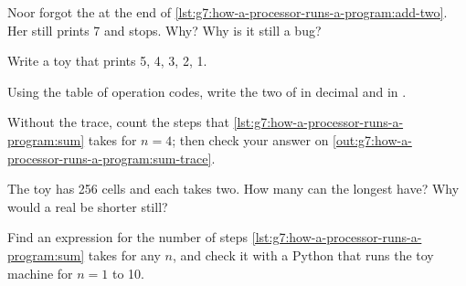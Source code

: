 \begin{exercise}[$\star\star$]\label{exo:g7:how-a-processor-runs-a-program:6}
Noor forgot the  at the end of
\cref{lst:g7:how-a-processor-runs-a-program:add-two}. Her  still
prints 7 and stops. Why? Why is it still a bug?
\end{exercise}

\begin{exercise}[$\star\star$]\label{exo:g7:how-a-processor-runs-a-program:7}
Write a toy  that prints 5, 4, 3, 2, 1.
\end{exercise}

\begin{exercise}[$\star\star$]\label{exo:g7:how-a-processor-runs-a-program:8}
Using the table of operation codes, write the two  of
 in decimal and in .
\end{exercise}

\begin{exercise}[$\star\star$]\label{exo:g7:how-a-processor-runs-a-program:9}
Without the trace, count the steps that
\cref{lst:g7:how-a-processor-runs-a-program:sum} takes for $n = 4$; then
check your answer on \cref{out:g7:how-a-processor-runs-a-program:sum-trace}.
\end{exercise}

\begin{exercise}[$\star\star\star$]\label{exo:g7:how-a-processor-runs-a-program:10}
The toy  has 256 cells and each  takes two. How many
 can the longest  have? Why would a real  be
shorter still?
\end{exercise}

\begin{exercise}[$\star\star\star$]\label{exo:g7:how-a-processor-runs-a-program:11}
Find an expression for the number of steps
\cref{lst:g7:how-a-processor-runs-a-program:sum} takes for any $n$, and check
it with a Python  that runs the toy machine for $n = 1$ to 10.
\end{exercise}

